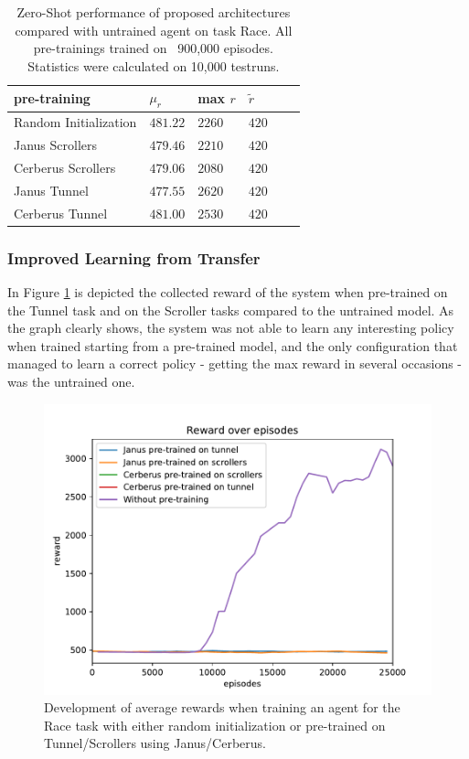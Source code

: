 \begin{table}[t!]
\begin{tabular}{llllll}
\toprule
pre-training   & $\mu_r$ & max $r$ & $\widetilde{r}$ \\ \midrule
Random Initialization                           &     $481.22$     &    $2260$     &      $420$      \\ \midrule
Janus Scrollers &     $479.46$     &    $2210$     &      $420$      \\ 
Cerberus Scrollers &     $479.06$     &    $2080$     &      $420$      \\ \midrule 
Janus Tunnel    &     $477.55$     &    $2620$     &      $420$      \\ 
Cerberus Tunnel    &     $481.00$     &    $2530$     &      $420$      \\ \bottomrule 

\end{tabular}
\caption{Zero-Shot performance of proposed architectures compared with untrained agent on task Race. All pre-trainings trained on ~900,000 episodes. Statistics were calculated on 10,000 testruns.}
\label{zero-shot-table}
\end{table}

\subsubsection{Improved Learning from Transfer}

In Figure \ref{fig:improved-learning} is depicted the collected reward of the system when pre-trained on the Tunnel task and on the Scroller tasks compared to the untrained model.
As the graph clearly shows, the system was not able to learn any interesting policy when trained starting from a pre-trained model, and the only configuration that managed to learn a correct policy - getting the max reward in several occasions - was the untrained one.

\begin{figure}
    \centering
    \includegraphics[width=\columnwidth]{img/rewards.pdf}
    \caption{Development of average rewards when training an agent for the Race task with either random initialization or pre-trained on Tunnel/Scrollers using Janus/Cerberus.}
    \label{fig:improved-learning}
\end{figure}